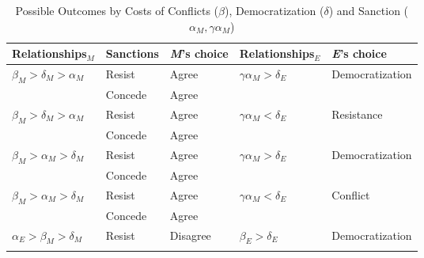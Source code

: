 \documentclass[11pt]{article}
\begin{document}
\begin{table}[!ht]
	\centering
	\caption{Possible Outcomes by Costs of Conflicts ($\beta$), Democratization ($\delta$) and Sanction ($\alpha_{M}, \gamma\alpha_{M}$)}
	\footnotesize
	\vspace{0.2cm}
	\begin{tabular}{ p{3cm} p{2cm} p{2cm} p{3cm} p{3cm} }
		\toprule
		\multicolumn{1}{p{3cm}}{Relationships$_{M}$} & \multicolumn{1}{p{2cm}}{Sanctions} & \multicolumn{1}{p{2cm}}{\textit{M}'s choice} & \multicolumn{1}{p{3cm}}{Relationships$_{E}$} & \multicolumn{1}{p{3cm}}{\textit{E}'s choice} \\
		\midrule
    \rowcolor{Gray}
		$\beta_{M} > \delta_{M} > \alpha_{M}$	& Resist   & Agree    & $\gamma\alpha_{M} > \delta_{E}$ & Democratization\\
    \rowcolor{Gray}
		                                      & Concede  & Agree    &                           &                \\
    $\beta_{M} > \delta_{M} > \alpha_{M}$	& Resist   & Agree    & $\gamma\alpha_{M} < \delta_{E}$                          & Resistance     \\
		                                      & Concede  & Agree    &                           &                \\
    \rowcolor{Gray}
		$\beta_{M} > \alpha_{M} > \delta_{M}$	& Resist   & Agree    & $\gamma\alpha_{M} > \delta_{E}$ & Democratization\\
    \rowcolor{Gray}

		                                      & Concede  & Agree    &                           &                \\
		$\beta_{M} > \alpha_{M} > \delta_{M}$	& Resist   & Agree    & $\gamma\alpha_{M} < \delta_{E}$ & Conflict     \\
                                          & Concede  & Agree    &                           &                \\
    \rowcolor{Gray} 
    $\alpha_{E} > \beta_{M} > \delta_{M}$	& Resist   & Disagree & $\beta_{E} > \delta_{E}$  & Democratization\\
    \rowcolor{Gray}


\end{tabular}
\end{table}
\end{document}
